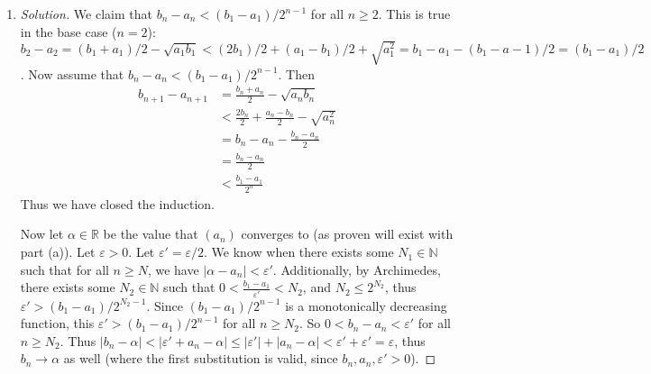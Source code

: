 \documentclass{article}
\newcommand{\N}{{\mathbb N}}
\newcommand{\R}{{\mathbb R}}
\newcommand{\ep}{{\varepsilon}}
\begin{document}
\begin{enumerate}
\begin{proof}[Solution]
		Note then that $(a_n)$ is monotonically increasing,
		and bounded by $a_1$ and $b_1$,
		and $(b_n)$ is monotonically decreasing,
		and bounded by $a_1$ and $b_1$ as well.
		Thus by the Monotone Convergence Theorem,
		and the fact $\R$ is complete,
		we have that $(a_n)$ and $(b_n)$ both converge.
	\end{proof}
	\item \begin{proof}[Solution]\let\qed\relax
		We claim that $b_n - a_n < (b_1 - a_1)/2^{n-1}$
		for all $n \geq 2$.
		This is true in the base case ($n = 2$): $b_2 - a_2 = (b_1 + a_1)/2 - \sqrt{a_1b_1}
		< (2b_1)/2 + (a_1 - b_1)/2 + \sqrt{a_1^2}
		= b_1 - a_1 - (b_1 - a-1)/2 = (b_1 - a_1)/2$.
		Now assume that $b_n - a_n < (b_1 - a_1)/2^{n-1}$.
		Then
		\begin{align*}
			b_{n+1} - a_{n+1}
			&= \frac{b_n+a_n}{2} - \sqrt{a_nb_n}\\
			&< \frac{2b_n}{2} + \frac{a_n - b_n}{2} - \sqrt{a_n^2}\\
			&= b_n - a_n - \frac{b_n - a_n}{2}\\
			&= \frac{b_n - a_n}{2}\\
			&< \frac{b_1 - a_1}{2^n}
		\end{align*}
		Thus we have closed the induction.

		Now let $\alpha \in \R$ be the value that $(a_n)$ converges to
		(as proven will exist with part (a)).
		Let $\ep > 0$.
		Let $\ep' = \ep/2$.
		We know when there exists some $N_1 \in \N$ such that for all $n \geq N$,
		we have $|\alpha - a_n| < \ep'$.
		Additionally, by Archimedes, there exists some $N_2 \in \N$ such that
		$0 < \frac{b_1-a_1}{\ep'} < N_2$,
		and $N_2 \leq 2^{N_2}$,
		thus $\ep' > (b_1 - a_1)/2^{N_2-1}$.
		Since $(b_1 - a_1)/2^{n-1}$ is a monotonically decreasing function,
		this $\ep' > (b_1 - a_1)/2^{n-1}$ for all $n \geq N_2$.
		So $0 < b_n - a_n < \ep'$ for all $n \geq N_2$.
		Thus $|b_n - \alpha| < |\ep' + a_n - \alpha| \leq |\ep'| + |a_n - \alpha|
		< \ep' + \ep' = \ep$,
		thus $b_n \to \alpha$ as well
		(where the first substitution is valid, since $b_n, a_n, \ep' > 0$).
	\end{proof}
\end{enumerate}
\clearpage
\end{document}
